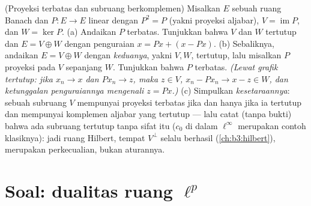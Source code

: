\begin{exercise}[$\star\star$]\label{exo:b3:banach:12}
(Proyeksi terbatas dan subruang berkomplemen) Misalkan $E$ sebuah
ruang Banach dan $P \colon E \to E$ linear dengan $P^2 = P$
(yakni proyeksi aljabar), $V = \operatorname{im}P$, dan $W =
\ker P$.
(a) Andaikan $P$ terbatas. Tunjukkan bahwa $V$ dan $W$ tertutup
dan $E = V \oplus W$ dengan penguraian $x = Px + (x -
Px)$.
(b) Sebaliknya, andaikan $E = V \oplus W$ dengan \emph{keduanya},
yakni $V, W$, tertutup, lalu misalkan $P$ proyeksi pada $V$ sepanjang $W$.
Tunjukkan bahwa $P$ terbatas. \emph{(Lewat grafik tertutup: jika $x_n \to x$
dan $Px_n \to z$, maka $z \in V$, $x_n - Px_n \to x - z \in
W$, dan ketunggalan penguraiannya mengenali $z =
Px$.)}
(c) Simpulkan \emph{kesetaraannya}: sebuah subruang $V$ mempunyai
proyeksi terbatas jika dan hanya jika ia tertutup dan mempunyai komplemen
aljabar yang tertutup --- lalu catat (tanpa bukti) bahwa
ada subruang tertutup tanpa sifat itu ($c_0$ di dalam
$\ell^\infty$ merupakan contoh klasiknya): jadi ruang Hilbert,
tempat $V^\perp$ selalu berhasil
(\cref{ch:b3:hilbert}), merupakan perkecualian, bukan aturannya.
\end{exercise}

\section{Soal: dualitas ruang \texorpdfstring{$\ell^p$}%
{lp}}

